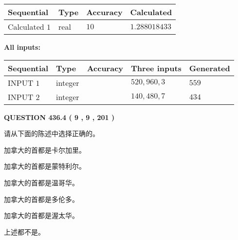 \documentclass{ctexart}
\begin{document}
   
   
   
\noindent{}
   
   
  
  
\noindent\begin{tabular}{|l|l|l|l|}
\hline
 Sequential & Type & Accuracy & Calculated \\ 
\hline
 
 
  Calculated $  1 $ & real & $  10  $ & 
 $ 1.288018433 $ 
 \\  \hline  
 \end{tabular}
   
   
   
   
\noindent\vspace{0.1in}\hspace{-0.08in} {\textbf{\Large{All inputs: }}}
   
   
  
  
\noindent\begin{tabular}{|l|l|l|l|l|}
\hline
 Sequential & Type & Accuracy & Three inputs & Generated \\ 
\hline
 
 
  INPUT $  1 $ & integer &  & $
 520
 , 
 960
 , 
 3
 $ & $ 559 $ 
 \\  \hline  
 
 
  INPUT $  2 $ & integer &  & $
 140
 , 
 480
 , 
 7
 $ & $ 434 $ 
 \\  \hline  
 \end{tabular}
   
   
  
\vspace{0.2in}
  
{\textbf{\Large{QUESTION
436.4 
 ( 9 , 9 , 201 )
}}}
  
  
请从下面的陈述中选择正确的。
 
 
加拿大的首都是卡尔加里。
 
 
加拿大的首都是蒙特利尔。
 
 
加拿大的首都是温哥华。
 
 
加拿大的首都是多伦多。
 
 
加拿大的首都是渥太华。
 
 
 上述都不是。
 
 
\noindent{}
 
\end{document}
